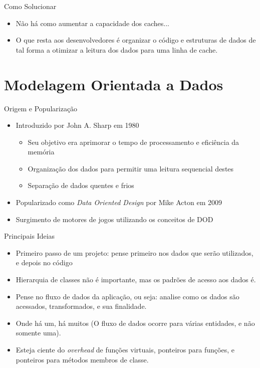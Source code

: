 \documentclass{beamer}
\begin{document}
\begin{frame}{Como Solucionar}
    \begin{itemize}
        \item Não há como aumentar a capacidade dos caches...
        \item O que resta aos desenvolvedores é organizar o código e estruturas de dados
              de tal forma a otimizar a leitura dos dados para uma linha de cache.
    \end{itemize}
\end{frame}

\section{Modelagem Orientada a Dados}

\frame{\tableofcontents[currentsection]}

\begin{frame}{Origem e Popularização}
    \begin{itemize}
        \item Introduzido por John A. Sharp em 1980
            \begin{itemize}
                \item Seu objetivo era aprimorar o tempo de processamento e eficiência da memória
                \item Organização dos dados para permitir uma leitura sequencial destes
                \item Separação de dados quentes e frios
            \end{itemize}
        \item Popularizado como \textit{Data Oriented Design} por Mike Acton em 2009
        \item Surgimento de motores de jogos utilizando os conceitos de DOD
    \end{itemize}
\end{frame}

\begin{frame}{Principais Ideias}
    \begin{itemize}
        \item Primeiro passo de um projeto: pense primeiro nos dados que serão utilizados, e depois no código
        \item Hierarquia de classes não é importante, mas os padrões de acesso aos dados é.
        \item Pense no fluxo de dados da aplicação, ou seja: analise como os dados são acessados, 
              transformados, e sua finalidade.
        \item Onde há um, há muitos (O fluxo de dados ocorre para várias entidades, e não somente uma).
        \item Esteja ciente do \textit{overhead} de funções virtuais, ponteiros para funções, e ponteiros para 
            métodos membros de classe.
    \end{itemize}
\end{frame}
\end{document}
